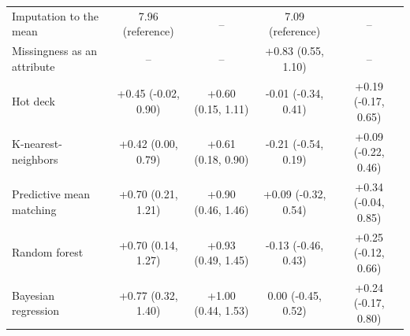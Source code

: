 \documentclass{article}
\begin{document}
\begin{table}
\begin{tabular}{lcccc}
\midrule
Imputation to the mean & 7.96 (reference) & -- & 7.09 (reference) & -- \\ 
Missingness as an attribute & -- & -- & +0.83 (0.55, 1.10) & -- \\ 
Hot deck & +0.45 (-0.02, 0.90) & +0.60 (0.15, 1.11) & -0.01 (-0.34, 0.41) & +0.19 (-0.17, 0.65) \\ 
K-nearest-neighbors & +0.42 (0.00, 0.79) & +0.61 (0.18, 0.90) & -0.21 (-0.54, 0.19) & +0.09 (-0.22, 0.46) \\ 
Predictive mean matching & +0.70 (0.21, 1.21) & +0.90 (0.46, 1.46) & +0.09 (-0.32, 0.54) & +0.34 (-0.04, 0.85) \\ 
Random forest & +0.70 (0.14, 1.27) & +0.93 (0.49, 1.45) & -0.13 (-0.46, 0.43) & +0.25 (-0.12, 0.66) \\ 
Bayesian regression & +0.77 (0.32, 1.40) & +1.00 (0.44, 1.53) & 0.00 (-0.45, 0.52) & +0.24 (-0.17, 0.80) \\ 
\bottomrule
\end{tabular} 
 \end{table}

\clearpage
\end{document}
